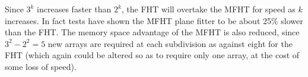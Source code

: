   Since $3^k$ increases faster than $2^k$, the FHT will overtake the MFHT for
  speed as $k$ increases. In fact tests have shown the MFHT plane fitter
  to be about 25\% slower than the FHT. The memory space
  advantage of the MFHT is also reduced, since $3^2 - 2^2 = 5$
  new arrays are required at each subdivision as against eight for the FHT
  (which again could be altered so as to require only one array, at the
  cost of some loss of speed).

